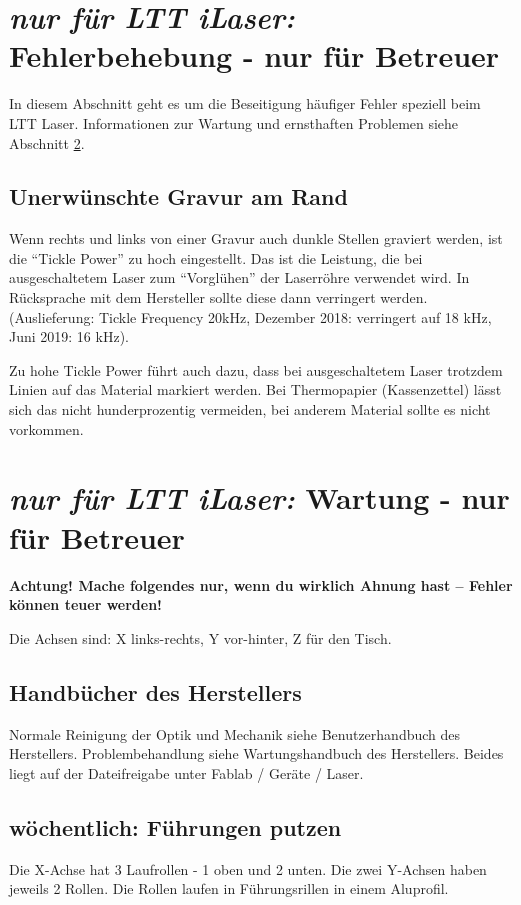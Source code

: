 \documentclass{\basedir/fablab-document}
\newcommand{\nurLTT}{\emph{nur für LTT iLaser:} }
\begin{document}
	\section{\nurLTT Fehlerbehebung - nur für Betreuer}
	In diesem Abschnitt geht es um die Beseitigung häufiger Fehler speziell beim LTT Laser.
	Informationen zur Wartung und ernsthaften Problemen siehe Abschnitt \ref{sec:wartung-ltt}.
	
	
	\subsection{Unerwünschte Gravur am Rand}
	Wenn rechts und links von einer Gravur auch dunkle Stellen graviert werden, ist die \enquote{Tickle Power} zu hoch eingestellt. Das ist die Leistung, die bei ausgeschaltetem Laser zum \enquote{Vorglühen} der Laserröhre verwendet wird. In Rücksprache mit dem Hersteller sollte diese dann verringert werden. (Auslieferung: Tickle Frequency 20kHz, Dezember 2018: verringert auf 18 kHz, Juni 2019: 16 kHz).
	
	Zu hohe Tickle Power führt auch dazu, dass bei ausgeschaltetem Laser trotzdem Linien auf das Material markiert werden. Bei Thermopapier (Kassenzettel) lässt sich das nicht hunderprozentig vermeiden, bei anderem Material sollte es nicht vorkommen.
	
	
	\section{\nurLTT Wartung - nur für Betreuer}
	\label{sec:wartung-ltt}
	\textbf{Achtung! Mache folgendes nur, wenn du wirklich Ahnung hast -- Fehler können teuer werden!}

	Die Achsen sind: X links-rechts, Y vor-hinter, Z für den Tisch.
	
	\subsection{Handbücher des Herstellers}
	Normale Reinigung der Optik und Mechanik siehe Benutzerhandbuch des Herstellers. Problembehandlung siehe Wartungshandbuch des Herstellers. Beides liegt auf der Dateifreigabe unter Fablab / Geräte / Laser.
	
	\subsection{wöchentlich: Führungen putzen}
	Die X-Achse hat 3 Laufrollen - 1 oben und 2 unten. Die zwei Y-Achsen haben jeweils 2 Rollen. Die Rollen laufen in Führungsrillen in einem Aluprofil.
	
\end{document}
